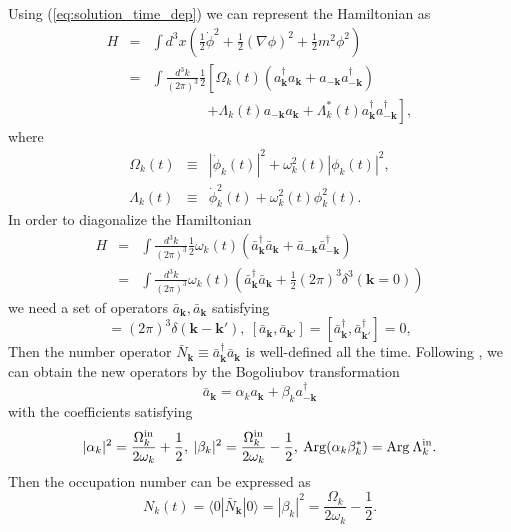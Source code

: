 \documentclass[twocolumn,showpacs,preprintnumbers,amsmath,amssymb,nofootinbib,superscriptaddress,prc]{revtex4}
\begin{document}
Using (\ref{eq:solution_time_dep}) we can represent the Hamiltonian as
\begin{eqnarray}
 H &=& \int d^3x \left( \frac{1}{2}\dot{\phi}^2 + \frac{1}{2}(\nabla \phi)^2 + \frac{1}{2}m^2\phi^2 \right) \\
  &=& \int \frac{d^3k}{(2\pi)^3} \frac{1}{2} \left[ \Omega_k(t) \left( a_{\mathbf{k}}^{\dagger} a_{\mathbf{k}} + a_{\mathbf{-k}} a_{\mathbf{-k}}^{\dagger} \right) \right. \nonumber \\
  & & \qquad \qquad \left. + \Lambda_k(t) a_{\mathbf{-k}} a_{\mathbf{k}} + \Lambda_k^*(t) a_{\mathbf{k}}^{\dagger} a_{\mathbf{-k}}^{\dagger} \right],
\end{eqnarray}
where
\begin{eqnarray}
 \Omega_k(t) & \equiv & |\dot{\phi}_k(t)|^2 + \omega_k^2(t) |\phi_k(t)|^2, \\
 \Lambda_k(t) & \equiv & \dot{\phi}_k^2(t) + \omega_k^2(t) \phi_k^2(t).
\end{eqnarray}
In order to diagonalize the Hamiltonian
\begin{eqnarray}
 H &=& \int \frac{d^3k}{(2\pi)^3} \frac{1}{2}\omega_k(t) \left( \bar{a}_{\mathbf{k}}^{\dagger} \bar{a}_{\mathbf{k}} + \bar{a}_{\mathbf{-k}} \bar{a}_{\mathbf{-k}}^{\dagger} \right) \\
  &=&  \int \frac{d^3k}{(2\pi)^3} \omega_k(t) \left( \bar{a}_{\mathbf{k}}^{\dagger} \bar{a}_{\mathbf{k}} + \frac{1}{2} (2\pi)^3\delta^3(\mathbf{k}=0)\right)
\end{eqnarray}
we need a set of operators $\bar{a}_{\mathbf{k}}, \bar{a}_{\mathbf{k}}$ satisfying \begin{equation}
 [\bar{a}_{\mathbf{k}}, \bar{a}^{\dagger}_{\mathbf{k'}}]=(2\pi)^3\delta(\mathbf{k-k'}),\:[\bar{a}_{\mathbf{k}}, \bar{a}_{\mathbf{k'}}]=[\bar{a}_{\mathbf{k}}^\dagger, \bar{a}_{\mathbf{k'}}^\dagger]=0,
\end{equation}
Then the number operator $\bar{N}_\mathbf{k}\equiv \bar{a}_{\mathbf{k}}^\dagger \bar{a}_{\mathbf{k}}$ is well-defined all the time. Following \cite{Garbrecht:2002pd}, we can obtain the new operators by the Bogoliubov transformation
\begin{equation}
 \bar{a}_{\mathbf{k}}=\alpha_ka_{\mathbf{k}}+\beta_ka_{\mathbf{-k}}^\dagger
\end{equation}
with the coefficients satisfying
\begin{equation}
 |\alpha_k|^2=\frac{\Omega_k^{\rm in}}{2\omega_k}+\frac{1}{2}, \:
 |\beta_k|^2=\frac{\Omega_k^{\rm in}}{2\omega_k}-\frac{1}{2}, \:
 {\rm Arg}(\alpha_k \beta_k^*) = {\rm Arg} \: \Lambda_k^{\rm in}.
\end{equation}
Then the occupation number can be expressed as
\begin{equation}
 N_k(t)=\langle 0|\bar{N}_\mathbf{k}|0\rangle=|\beta_k|^2=\frac{\Omega_k}{2\omega_k}-\frac{1}{2}.
\end{equation}
\end{document}
